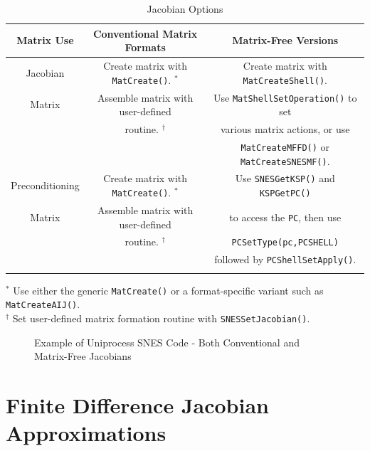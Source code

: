 \begin{center}
\begin{table}
\begin{tabular}{ccc}
{\bf Matrix Use} & {\bf Conventional Matrix Formats}                & {\bf Matrix-Free Versions}\\
\hline
Jacobian         & Create matrix with \lstinline|MatCreate()|. $^*$ & Create matrix with \lstinline|MatCreateShell()|.\\
Matrix           & Assemble matrix with user-defined                & Use \lstinline|MatShellSetOperation()| to set\\
                 & routine. $ ^\dagger $                            & various matrix actions, or use\\
                 &                                                  & \lstinline|MatCreateMFFD()| or \lstinline|MatCreateSNESMF()|.\\
\hline
Preconditioning  & Create matrix with \lstinline|MatCreate()|. $^*$ & Use \lstinline|SNESGetKSP()| and \lstinline|KSPGetPC()| \\
Matrix           & Assemble matrix with user-defined                & to access the \lstinline|PC|, then use\\
                 & routine. $ ^\dagger $                            & \lstinline|PCSetType(pc,PCSHELL)|\\
                 &                                                  & followed by \lstinline|PCShellSetApply()|. \\

\hline
& & \\
\end{tabular}
\medskip
$^*$ Use either the generic \lstinline|MatCreate()| or a format-specific variant
   such as \lstinline|MatCreateAIJ()|.\\
$^\dagger$ Set user-defined matrix formation routine with \lstinline{SNESSetJacobian()}.
\medskip
\caption{Jacobian Options}
\label{tab_jacobians}
\end{table}
\end{center}

\begin{figure}[H]

\caption{Example of Uniprocess SNES Code - Both Conventional and Matrix-Free Jacobians}
\label{fig_snesexample2}
\end{figure}

\section{Finite Difference Jacobian Approximations}
\label{sec_fdmatrix}

